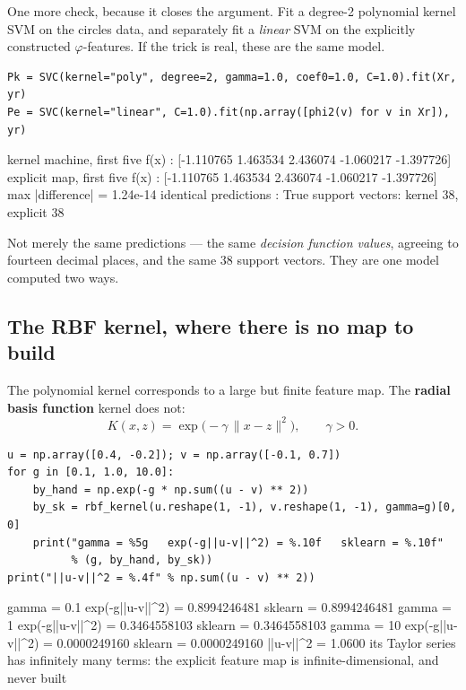 \documentclass[11pt]{article}
\begin{document}
One more check, because it closes the argument. Fit a degree-2 polynomial
kernel SVM on the circles data, and separately fit a \emph{linear} SVM on the
explicitly constructed $\varphi$-features. If the trick is real, these are the
same model.

\begin{lstlisting}
Pk = SVC(kernel="poly", degree=2, gamma=1.0, coef0=1.0, C=1.0).fit(Xr, yr)
Pe = SVC(kernel="linear", C=1.0).fit(np.array([phi2(v) for v in Xr]), yr)
\end{lstlisting}
\begin{codeout}
kernel machine, first five f(x) : [-1.110765  1.463534  2.436074 -1.060217 -1.397726]
explicit map,   first five f(x) : [-1.110765  1.463534  2.436074 -1.060217 -1.397726]
max |difference|                = 1.24e-14
identical predictions           : True
support vectors: kernel 38, explicit 38
\end{codeout}

Not merely the same predictions --- the same \emph{decision function values},
agreeing to fourteen decimal places, and the same $38$ support vectors. They
are one model computed two ways.

\subsection{The RBF kernel, where there is no map to build}

The polynomial kernel corresponds to a large but finite feature map. The
\textbf{radial basis function} kernel does not:
\begin{equation}
  K(x,z) = \exp\bigl(-\gamma\,\|x - z\|^2\bigr), \qquad \gamma > 0 .
  \label{eq:rbf}
\end{equation}

\begin{lstlisting}
u = np.array([0.4, -0.2]); v = np.array([-0.1, 0.7])
for g in [0.1, 1.0, 10.0]:
    by_hand = np.exp(-g * np.sum((u - v) ** 2))
    by_sk = rbf_kernel(u.reshape(1, -1), v.reshape(1, -1), gamma=g)[0, 0]
    print("gamma = %5g   exp(-g||u-v||^2) = %.10f   sklearn = %.10f"
          % (g, by_hand, by_sk))
print("||u-v||^2 = %.4f" % np.sum((u - v) ** 2))
\end{lstlisting}
\begin{codeout}
gamma =   0.1   exp(-g||u-v||^2) = 0.8994246481   sklearn = 0.8994246481
gamma =     1   exp(-g||u-v||^2) = 0.3464558103   sklearn = 0.3464558103
gamma =    10   exp(-g||u-v||^2) = 0.0000249160   sklearn = 0.0000249160
||u-v||^2 = 1.0600
its Taylor series has infinitely many terms:
the explicit feature map is infinite-dimensional, and never built
\end{codeout}
\end{document}
